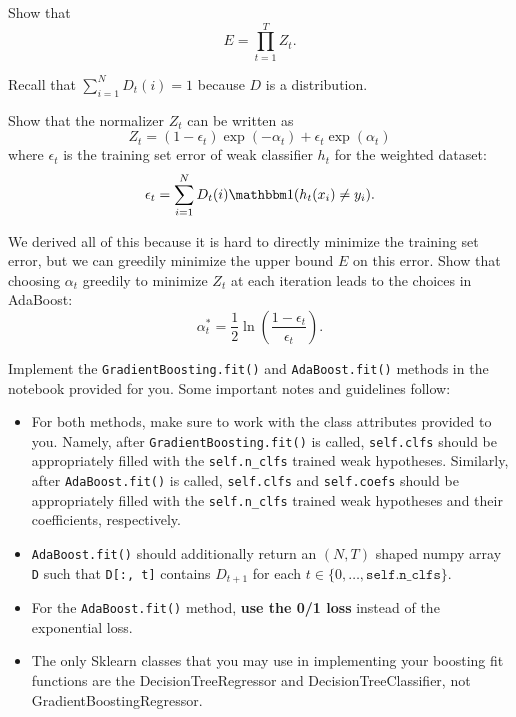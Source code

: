 \documentclass{article}
\begin{document}
\problem[5]
Show that
$$E = \prod\limits_{t=1}^T Z_t.$$

\begin{hint}
	Recall that $\sum_{i = 1}^N D_t(i) = 1$ because $D$ is a distribution.
\end{hint}

\begin{solution}

\end{solution}

\problem[5]
Show that the normalizer $Z_t$ can be written as
\[Z_t = (1 - \epsilon_t) \exp(-\alpha_t) + \epsilon_{t} \exp(\alpha_t)\]
where $\epsilon_t$ is the training set error of weak classifier $h_t$ for the weighted dataset:
\[\epsilon_t = \sum\limits_{i=1}^N D_t(i)\mathbbm1(h_t(x_i) \neq y_i).\]

\begin{solution}
	
\end{solution}

\problem[2]
We derived all of this because it is hard to directly minimize the training set error, but we can greedily minimize the upper bound $E$ on this error. Show that choosing $\alpha_t$
greedily to minimize $Z_t$ at each iteration leads to the choices in
AdaBoost:
$$\alpha_{t}^* = \frac{1}{2} \ln \left(\frac{1 - \epsilon_t}{\epsilon_t} \right).$$

\begin{solution}
	
\end{solution}

\begin{problem}[14]
    Implement the \texttt{GradientBoosting.fit()} and \texttt{AdaBoost.fit()} methods in the notebook provided for you. Some important notes and guidelines follow:
    \begin{itemize}
        \item For both methods, make sure to work with the class attributes provided to you. Namely, after \texttt{GradientBoosting.fit()} is called, \texttt{self.clfs} should be appropriately filled with the \texttt{self.n_clfs} trained weak hypotheses. Similarly, after \texttt{AdaBoost.fit()} is called, \texttt{self.clfs} and \texttt{self.coefs} should be appropriately filled with the \texttt{self.n_clfs} trained weak hypotheses and their coefficients, respectively.
        \item \texttt{AdaBoost.fit()} should additionally return an $(N, T)$ shaped numpy array \texttt{D} such that \texttt{D[:, t]} contains $D_{t+1}$ for each $t \in \{0, \ldots, \texttt{self.n_clfs}\}$.
        \item For the \texttt{AdaBoost.fit()} method, \textbf{use the 0/1 loss} instead of the exponential loss.
	\item The only Sklearn classes that you may use in implementing your boosting fit functions are the DecisionTreeRegressor and DecisionTreeClassifier, not GradientBoostingRegressor.
    \end{itemize}
\end{problem}
\end{document}
